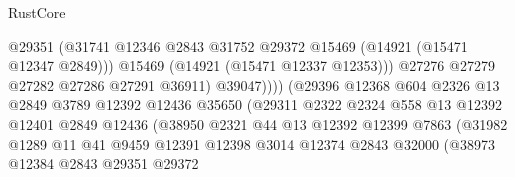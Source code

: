 \begin{lexlean}{RustCore}
\begin{coremodule}
                                          @29351
                                          (@31741
                                            @12346
                                            @2843
                                            @31752
                                            @29372
                                            @15469
                                            (@14921 (@15471 @12347 @2849)))
                                          @15469
                                          (@14921 (@15471 @12337 @12353)))
                                        @27276
                                        @27279
                                        @27282
                                        @27286
                                        @27291
                                        @36911)
                                      @39047))))
                              (@29396
                                @12368
                                @604
                                @2326
                                @13
                                @2849
                                @3789
                                @12392
                                @12436
                                @35650
                                (@29311
                                  @2322
                                  @2324
                                  @558
                                  @13
                                  @12392
                                  @12401
                                  @2849
                                  @12436
                                  (@38950
                                    @2321
                                    @44
                                    @13
                                    @12392
                                    @12399
                                    @7863
                                    (@31982
                                      @1289
                                      @11
                                      @41
                                      @9459
                                      @12391
                                      @12398
                                      @3014
                                      @12374
                                      @2843
                                      @32000
                                      (@38973
                                        @12384
                                        @2843
                                        @29351
                                        @29372

\end{coremodule}
\end{lexlean}
